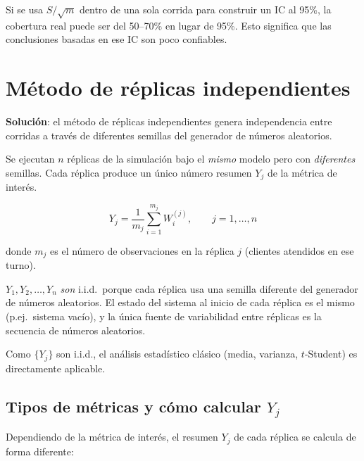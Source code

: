 \documentclass[11pt, letterpaper]{article}
\begin{document}
\begin{alertabox}
Si se usa $S/\sqrt{m}$ dentro de una sola corrida para construir un IC al 95\%, la cobertura real puede ser del 50--70\% en lugar de 95\%. Esto significa que las conclusiones basadas en ese IC son poco confiables.
\end{alertabox}

\section{Método de réplicas independientes}

\textbf{Solución}: el método de réplicas independientes genera independencia entre corridas a través de diferentes semillas del generador de números aleatorios.

Se ejecutan $n$ réplicas de la simulación bajo el \emph{mismo} modelo pero con \emph{diferentes} semillas. Cada réplica produce un único número resumen $Y_j$ de la métrica de interés.

\[
Y_j = \frac{1}{m_j}\sum_{i=1}^{m_j} W_i^{(j)}, \qquad j = 1, \ldots, n
\]

donde $m_j$ es el número de observaciones en la réplica $j$ (clientes atendidos en ese turno).

\begin{definicionbox}
$Y_1, Y_2, \ldots, Y_n$ \emph{son} i.i.d.\ porque cada réplica usa una semilla diferente del generador de números aleatorios. El estado del sistema al inicio de cada réplica es el mismo (p.ej.\ sistema vacío), y la única fuente de variabilidad entre réplicas es la secuencia de números aleatorios.
\end{definicionbox}

Como $\{Y_j\}$ son i.i.d., el análisis estadístico clásico (media, varianza, $t$-Student) es directamente aplicable.

\subsection{Tipos de métricas y cómo calcular $Y_j$}

Dependiendo de la métrica de interés, el resumen $Y_j$ de cada réplica se calcula de forma diferente:
\end{document}
